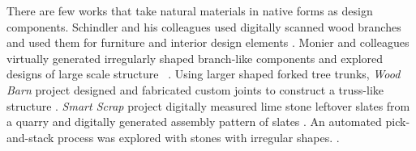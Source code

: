 There are few works that take natural materials in native forms as design components.
Schindler and his colleagues used digitally scanned wood branches and used them for furniture and interior design elements \cite{schindler2014processing}.
Monier and colleagues virtually generated irregularly shaped branch-like components and explored designs of large scale structure ~\cite{monier2013use}.
Using larger shaped forked tree trunks, \textit{Wood Barn} project designed and fabricated custom joints to construct a truss-like structure \cite{woodbarn}.
\textit{Smart Scrap} project digitally measured lime stone leftover slates from a quarry and digitally generated assembly pattern of slates \cite{smartscrap}.
An automated pick-and-stack process was explored with stones with irregular shapes. \cite{stonestacking}.
